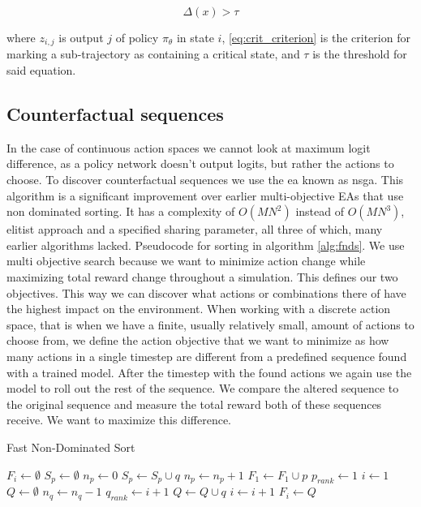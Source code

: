 \documentclass[UKenglish]{uiomasterthesis}
\begin{document}
\begin{equation}
\label{eq:crit_criterion}
\Delta(x) > \tau
\end{equation}

where $z_{i,j}$ is output $j$ of policy $\pi_\theta$ in state $i$, \ref{eq:crit_criterion} is the criterion for marking a sub-trajectory as containing a critical state, and $\tau$ is the threshold for said equation.


\subsection{Counterfactual sequences}
\label{sec:counterfactual}
In the case of continuous action spaces we cannot look at maximum logit difference, as a policy network doesn't output logits, but rather the actions to choose. To discover counterfactual sequences we use the \ac{ea} known as \ac{nsga}. This algorithm is a significant improvement over earlier multi-objective EAs that use non dominated sorting. It has a complexity of $O(MN^2)$ instead of $O(MN^3)$, elitist approach and a specified sharing parameter, all three of which, many earlier algorithms lacked. \cite{Deb2001AFA} Pseudocode for sorting in algorithm \ref{alg:fnds}. 
We use multi objective search because we want to minimize action change while maximizing total reward change throughout a simulation. This defines our two objectives. This way we can discover what actions or combinations there of have the highest impact on the environment. When working with a discrete action space, that is when we have a finite, usually relatively small, amount of actions to choose from, we define the action objective that we want to minimize as how many actions in a single timestep are different from a predefined sequence found with a trained model. After the timestep with the found actions we again use the model to roll out the rest of the sequence. We compare the altered sequence to the original sequence and measure the total reward both of these sequences receive. We want to maximize this difference. 

\begin{algorithm}
\caption{Fast Non-Dominated Sort}
\label{alg:fnds}
\begin{algorithmic}
    \State $F_i \gets \emptyset$
    \State $S_p \gets \emptyset$
    \State $n_p \gets 0$
                \State $S_p \gets S_p \cup q$
                \State $n_p \gets n_p + 1$
            \EndIf
        \EndFor
            \State $F_1 \gets F_1 \cup p$
            \State $p_{rank} \gets 1$
        \EndIf
    \EndFor
    \State $i \gets 1$
        \State $Q \gets \emptyset$
                \State $n_q \gets n_q - 1$
                    \State $q_{rank} \gets i + 1$
                    \State $Q \gets Q \cup q$
                \EndIf
            \EndFor
        \EndFor
        \State $i \gets i + 1$
        \State $F_i \gets Q$
    \EndWhile
\end{algorithmic}
\end{algorithm}
\end{document}
